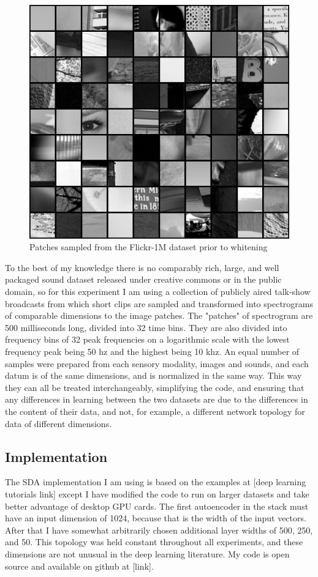 \documentclass[12pt]{article}
\begin{document}
\begin{doublespacing}
\begin{figure}[p]
\centering
\includegraphics[width=6in]{patch_arrangment}
\caption{Patches sampled from the Flickr-1M dataset prior to whitening}
\end{figure}
	
	To the best of my knowledge there is no comparably rich, large, and well packaged sound dataset released under creative commons or in the public domain, so for this experiment I am using a collection of publicly aired talk-show broadcasts from which short clips are sampled and transformed into spectrograms of comparable dimensions to the image patches. The "patches" of spectrogram are 500 milliseconds long, divided into 32 time bins. They are also divided into frequency bins of 32 peak frequencies on a logarithmic scale with the lowest frequency peak being 50 hz and the highest being 10 khz. An equal number of samples were prepared from each sensory modality, images and sounds, and each datum is of the same dimensions, and is normalized in the same way. This way they can all be treated interchangeably, simplifying the code, and ensuring that any differences in learning between the two datasets are due to the differences in the content of their data, and not, for example, a different network topology for data of different dimensions.
	
	\subsection{Implementation}
	The SDA implementation I am using is based on the examples at [deep learning tutorials link] except I have modified the code to run on larger datasets and take better advantage of desktop GPU cards. The first autoencoder in the stack must have an input dimension of 1024, because that is the width of the input vectors. After that I have somewhat arbitrarily chosen additional layer widths of 500, 250, and 50. This topology was held constant throughout all experiments, and these dimensions are not unusual in the deep learning literature. My code is open source and available on github at [link]. 
	

\end{doublespacing}
\end{document}
